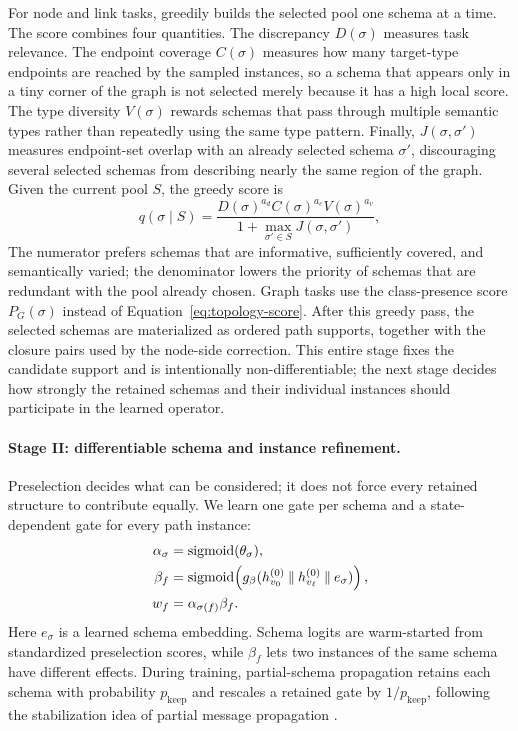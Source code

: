 For node and link tasks, \ampss{} greedily builds the selected pool one schema at a time.  The
score combines four quantities.  The discrepancy \(D(\sigma)\) measures task relevance.  The
endpoint coverage \(C(\sigma)\) measures how many target-type endpoints are reached by the sampled
instances, so a schema that appears only in a tiny corner of the graph is not selected merely
because it has a high local score.  The type diversity \(V(\sigma)\) rewards schemas that pass
through multiple semantic types rather than repeatedly using the same type pattern.  Finally,
\(J(\sigma,\sigma')\) measures endpoint-set overlap with an already selected schema
\(\sigma'\), discouraging several selected schemas from describing nearly the same region of the
graph.  Given the current pool \(S\), the greedy score is
\begin{equation}
  q(\sigma\mid S)=
  \frac{D(\sigma)^{a_d}C(\sigma)^{a_c}V(\sigma)^{a_v}}
       {1+\max_{\sigma'\in S}J(\sigma,\sigma')} ,
  \label{eq:topology-score}
\end{equation}
The numerator prefers schemas that are informative, sufficiently covered, and semantically varied;
the denominator lowers the priority of schemas that are redundant with the pool already chosen.
Graph tasks use the class-presence score \(P_G(\sigma)\) instead of Equation~\ref{eq:topology-score}.
After this greedy pass, the selected schemas are materialized as ordered path supports, together
with the closure pairs used by the node-side correction.  This entire stage fixes the candidate
support and is intentionally non-differentiable; the next stage decides how strongly the retained
schemas and their individual instances should participate in the learned operator.

\paragraph{Stage II: differentiable schema and instance refinement.}
Preselection decides what can be considered; it does not force every retained structure to
contribute equally.  We learn one gate per schema and a state-dependent gate for every path
instance:
\begin{equation}
  \begin{aligned}
  \alpha_\sigma&=\operatorname{sigmoid}(\theta_\sigma),\\
  \beta_f&=\operatorname{sigmoid}\!\left(
    g_\beta(h_{v_0}^{(0)}\mathbin\Vert h_{v_\ell}^{(0)}\mathbin\Vert e_\sigma)
  \right),\\
  w_f&=\alpha_{\sigma(f)}\beta_f .
  \end{aligned}
  \label{eq:gates}
\end{equation}
Here \(e_\sigma\) is a learned schema embedding.  Schema logits are warm-started from standardized
preselection scores, while \(\beta_f\) lets two instances of the same schema have different
effects.  During training, partial-schema propagation retains each schema with probability
\(p_{\mathrm{keep}}\) and rescales a retained gate by \(1/p_{\mathrm{keep}}\), following the
stabilization idea of partial message propagation \cite{li2023pmmm}.

